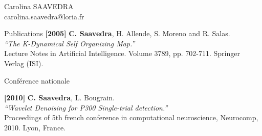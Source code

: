 \documentclass[letterpaper]{article}
\begin{document}
\begin{cv}{{\huge Carolina SAAVEDRA}\\
carolina.saavedra@loria.fr}
\begin{cvlist}{Publications}
\textbf{[2005]} \textbf{C. Saavedra}, H. Allende, S. Moreno and R. Salas.\\
{\it ``The K-Dynamical Self Organizing Map.''}\\ Lecture Notes in
Artificial Intelligence. Volume 3789, pp. 702-711. Springer Verlag
(ISI).

\item[Conférence nationale]

\textbf{[2010]} \textbf{C. Saavedra}, L. Bougrain.\\
{\it ``Wavelet Denoising for P300 Single-trial detection.''}\\
Proceedings of 5th french conference in computational neuroscience, Neurocomp, 2010. Lyon, France.
%
% 
% 
% 
% 
\end{cvlist}


% 


\end{cv}
\end{document}
